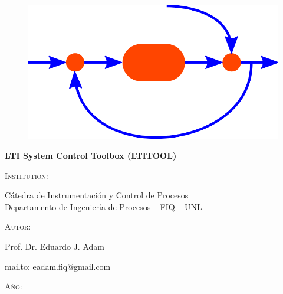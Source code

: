 \titlepage

\begin{figure}
 \centering
 \includegraphics[scale=0.3]{./figuras/logos/logo_ltitool.png}
\end{figure}


\begin{center}


\vspace{0.5cm}


\Large\textbf{LTI System Control Toolbox (LTITOOL)}


\vspace{1.5cm}
\normalsize{\textsc{Institution:}}

\normalsize{Cátedra de Instrumentación y Control de Procesos \\ Departamento de Ingeniería de Procesos -- FIQ -- UNL}



\vspace{1.5cm}
\textsc{Autor:}
\vspace{0.2cm}

\large{Prof. Dr. Eduardo J. Adam}
\vspace{0.1cm}

mailto: eadam.fiq@gmail.com


\vspace{0.5cm}
\vfill \textsc{A\~{n}o:} \Year
\end{center}

\newpage

